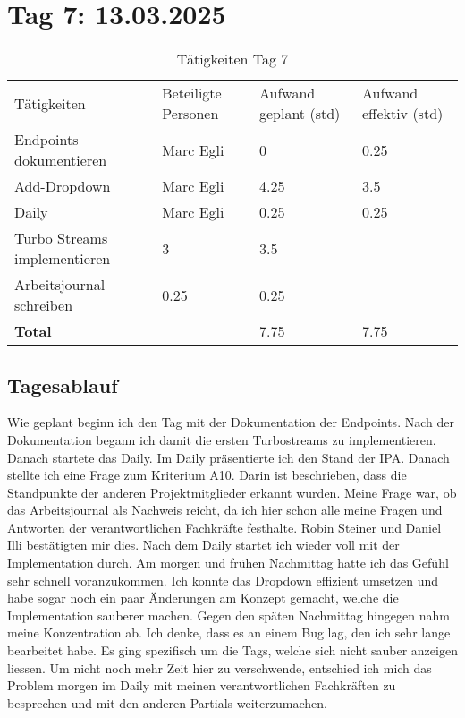 \section{Tag 7: 13.03.2025}
\begin{table}[H]
    \begin{tabular}{|L{0.4\textwidth}|C{60pt}|C{60pt}|C{60pt}|}
        \hline
        \color{white}Tätigkeiten & \color{white}Beteiligte \color{white}Personen & \color{white}Aufwand geplant (std) & \color{white}Aufwand effektiv (std) \\
        Endpoints dokumentieren & Marc Egli & 0 & 0.25 \\
        \hline
        Add-Dropdown & Marc Egli & 4.25 & 3.5 \\
        \hline
        Daily & Marc Egli & 0.25 & 0.25 \\
        \hline
        Turbo Streams implementieren & 3 & 3.5 \\
        \hline
        Arbeitsjournal schreiben & 0.25 & 0.25 \\
        \textbf{Total} &  & 7.75 & 7.75 \\
        \hline
    \end{tabular}
    \caption{Tätigkeiten Tag 7}
\end{table}

\subsection*{Tagesablauf}
Wie geplant beginn ich den Tag mit der Dokumentation der Endpoints. Nach der Dokumentation begann ich damit die ersten Turbostreams zu implementieren.
Danach startete das Daily. Im Daily präsentierte ich den Stand der IPA. Danach stellte ich eine Frage zum Kriterium A10. Darin ist beschrieben, dass die Standpunkte der
anderen Projektmitglieder erkannt wurden. Meine Frage war, ob das Arbeitsjournal als Nachweis reicht, da ich hier schon alle meine Fragen und Antworten der verantwortlichen 
Fachkräfte festhalte. Robin Steiner und Daniel Illi bestätigten mir dies. Nach dem Daily startet ich wieder voll mit der Implementation durch. 
Am morgen und frühen Nachmittag hatte ich das Gefühl sehr schnell voranzukommen. Ich konnte das Dropdown effizient umsetzen und habe sogar noch ein paar Änderungen am Konzept gemacht,
welche die Implementation sauberer machen. Gegen den späten Nachmittag hingegen nahm meine Konzentration ab. Ich denke, dass es an einem Bug lag, den ich sehr lange
bearbeitet habe. Es ging spezifisch um die Tags, welche sich nicht sauber anzeigen liessen. Um nicht noch mehr Zeit hier zu verschwende, entschied ich mich
das Problem morgen im Daily mit meinen verantwortlichen Fachkräften zu besprechen und mit den anderen Partials weiterzumachen. 

